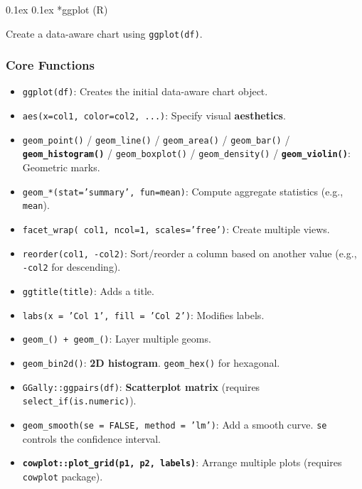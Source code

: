 \documentclass[8pt,landscape]{article}
\makeatletter
\renewcommand{\subsection}{\@startsection{subsection}{2}{0pt}%
    {0.1ex}%
    {0.1ex}%
    {\fontsize{8}{9}\bfseries\color{blue}}} %
\newcommand{\code}[1]{\textcolor{myred}{\texttt{#1}}}
\newcommand{\smalltext}[1]{%
  {\fontsize{8}{9}\selectfont\sloppy #1\par}%
}
\makeatother
\begin{document}
\begin{multicols}{3}
\subsection*{ggplot (R)}
\smalltext{Create a data-aware chart using \code{ggplot(df)}.}

\subsubsection*{Core Functions}
\begin{itemize}
\item \code{ggplot(df)}: Creates the initial data-aware chart object.
\item \code{aes(x=col1, color=col2, ...)}: Specify visual \textbf{aesthetics}.
\item \code{geom\_point()} / \code{geom\_line()} / \code{geom\_area()} / \code{geom\_bar()} / \textbf{\code{geom\_histogram()}} / \code{geom\_boxplot()} / \code{geom\_density()} / \textbf{\code{geom\_violin()}}: Geometric marks.
\item \code{geom\_*(stat='summary', fun=mean)}: Compute aggregate statistics (e.g., \code{mean}).
\item \code{facet\_wrap(~col1, ncol=1, scales='free')}: Create multiple views.
\item \code{reorder(col1, -col2)}: Sort/reorder a column based on another value (e.g., \code{-col2} for descending).
\item \code{ggtitle(title)}: Adds a title.
\item \code{labs(x = 'Col 1', fill = 'Col 2')}: Modifies labels.
\item \code{geom\_() + geom\_()}: Layer multiple geoms.
\item \code{geom\_bin2d()}: \textbf{2D histogram}. \code{geom\_hex()} for hexagonal.
\item \code{GGally::ggpairs(df)}: \textbf{Scatterplot matrix} (requires \code{select\_if(is.numeric)}).
\item \code{geom\_smooth(se = FALSE, method = 'lm')}: Add a smooth curve. \code{se} controls the confidence interval.
\item \textbf{\code{cowplot::plot\_grid(p1, p2, labels)}}: Arrange multiple plots (requires \code{cowplot} package).
\end{itemize}


\end{multicols}
\end{document}
